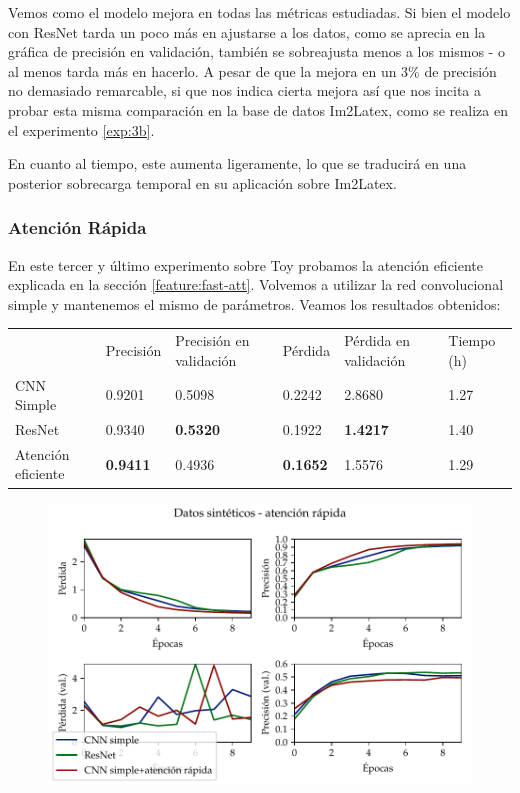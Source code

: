 \documentclass[a4paper, 20pt, dvipsnames]{article}
\begin{document}
Vemos como el modelo mejora en todas las métricas estudiadas. Si bien el modelo
con ResNet tarda un poco más en ajustarse a los datos, como se aprecia en la gráfica
de precisión en validación, también se sobreajusta menos a los mismos - o al menos
tarda más en hacerlo. A pesar de que la mejora en un 3\% de precisión no demasiado
remarcable, si que nos indica cierta mejora así que nos incita a probar esta misma
comparación en la base de datos Im2Latex, como se realiza en el experimento \ref{exp:3b}.

En cuanto al tiempo, este aumenta ligeramente, lo que se traducirá en una posterior
sobrecarga temporal en su aplicación sobre Im2Latex.


\subsubsection{Atención Rápida}
\label{exp:toy3}

En este tercer y último experimento sobre Toy probamos la atención eficiente explicada en la sección \ref{feature:fast-att}. Volvemos a utilizar la red convolucional simple y mantenemos el mismo de parámetros. Veamos los resultados obtenidos:

\begin{table}[h]
	\centering
	\begin{tabular}{llllll}
		& Precisión       & Precisión en validación & Pérdida         & Pérdida en validación & Tiempo (h) \\ \cline{2-6} 
		CNN Simple         & 0.9201          & 0.5098                  & 0.2242          & 2.8680                & 1.27       \\
		ResNet             & 0.9340          & \textbf{0.5320}         & 0.1922          & \textbf{1.4217}       & 1.40       \\
		Atención eficiente & \textbf{0.9411} & 0.4936                  & \textbf{0.1652} & 1.5576                & 1.29      
	\end{tabular}
\end{table}

\begin{figure}[H]
	\centering
	\includegraphics{fig/toy-3.pdf}
\end{figure}
\end{document}
